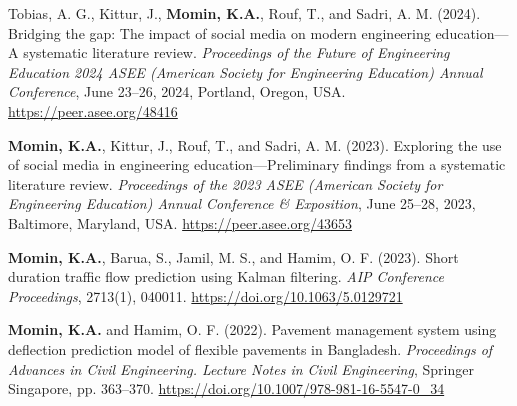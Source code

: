 \documentclass[a4paper,11pt]{article}
\begin{document}
\begin{enumerate}[leftmargin=*, labelsep=0em, align=left, widest={[\textbf{C.10}]}, itemindent=0em, label={\textbf{[C.\arabic*]}}]
\begin{justifying}
\item Tobias, A. G., Kittur, J., \textbf{Momin, K.A.}, Rouf, T., and Sadri, A. M. (2024). Bridging the gap: The impact of social media on modern engineering education—A systematic literature review. \textit{Proceedings of the Future of Engineering Education 2024 ASEE (American Society for Engineering Education) Annual Conference}, June 23–26, 2024, Portland, Oregon, USA. \href{https://peer.asee.org/48416}{https://peer.asee.org/48416}

\item \textbf{Momin, K.A.}, Kittur, J., Rouf, T., and Sadri, A. M. (2023). Exploring the use of social media in engineering education—Preliminary findings from a systematic literature review. \textit{Proceedings of the 2023 ASEE (American Society for Engineering Education) Annual Conference \& Exposition}, June 25–28, 2023, Baltimore, Maryland, USA. \href{https://peer.asee.org/43653}{https://peer.asee.org/43653}

\item \textbf{Momin, K.A.}, Barua, S., Jamil, M. S., and Hamim, O. F. (2023). Short duration traffic flow prediction using Kalman filtering. \textit{AIP Conference Proceedings}, 2713(1), 040011. \href{https://doi.org/10.1063/5.0129721}{https://doi.org/10.1063/5.0129721}

\item \textbf{Momin, K.A.} and Hamim, O. F. (2022). Pavement management system using deflection prediction model of flexible pavements in Bangladesh. \textit{Proceedings of Advances in Civil Engineering. Lecture Notes in Civil Engineering}, Springer Singapore, pp. 363–370. \href{https://doi.org/10.1007/978-981-16-5547-0\_34}{https://doi.org/10.1007/978-981-16-5547-0\_34}

\vspace{4mm}
\end{justifying}
\end{enumerate}
\end{document}
